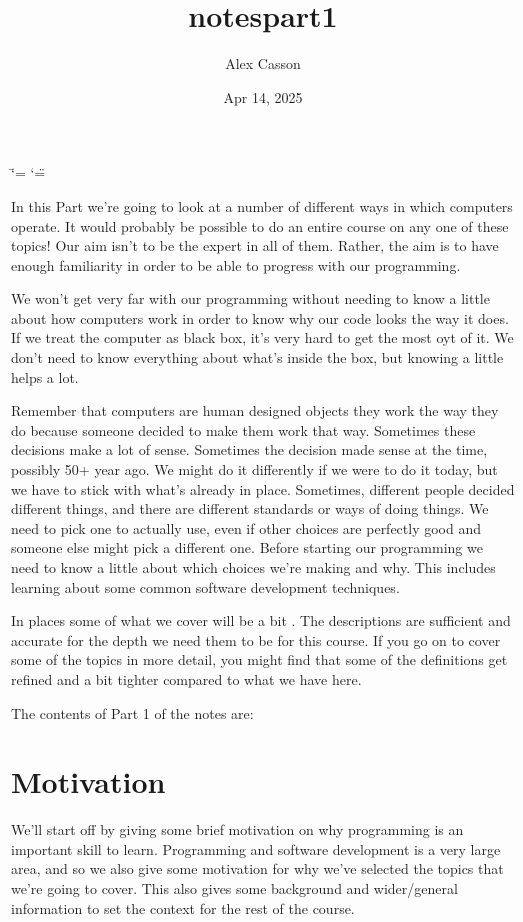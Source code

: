 \documentclass[letterpaper,10pt,british]{sphinxmanual}
\title{notes\sphinxhyphen{}part1}
\date{Apr 14, 2025}
\author{Alex Casson}
\begin{document}
\ifdefined\shorthandoff
  \ifnum\catcode`\=\string=\active\shorthandoff{=}\fi
  \ifnum\catcode`\"=\active{}\fi
\fi

\pagestyle{empty}
\sphinxmaketitle
\pagestyle{plain}
\sphinxtableofcontents
\pagestyle{normal}
\label{\detokenize{index::doc}}


\sphinxAtStartPar
In this Part we’re going to look at a number of different ways in which computers operate. It would probably be possible to do an entire course on any one of these topics! Our aim isn’t to be the expert in all of them. Rather, the aim is to have enough familiarity in order to be able to progress with our programming.

\sphinxAtStartPar
We won’t get very far with our programming without needing to know a little about how computers work  in order to know why our code looks the way it does. If we treat the computer as black box, it’s very hard to get the most oyt of it. We don’t need to know everything about what’s inside the box, but knowing a little helps a lot.

\sphinxAtStartPar
Remember that computers are human designed objects \sphinxhyphen{} they work the way they do because someone decided to make them work that way. Sometimes these decisions make a lot of sense. Sometimes the decision made sense at the time, possibly 50+ year ago. We might do it differently if we were to do it today, but we have to stick with what’s already in place. Sometimes, different people decided different things, and there are different standards or ways of doing things. We need to pick one to actually use, even if other choices are perfectly good and someone else might pick a different one. Before starting our programming we need to know a little about which choices we’re making and why. This includes learning about some common software development techniques.

\sphinxAtStartPar
In places some of what we cover will be a bit . The descriptions are sufficient and accurate for the depth we need them to be for this course. If you go on to cover some of the topics in more detail, you might find that some of the definitions get refined and a bit tighter compared to what we have here.

\sphinxAtStartPar
The contents of Part 1 of the notes are:

\sphinxstepscope


\chapter{Motivation}
\label{\detokenize{chapters/motivation:motivation}}\label{\detokenize{chapters/motivation::doc}}
\sphinxAtStartPar
We’ll start off by giving some brief motivation on why programming is an important skill to learn. Programming and software development is a very large area, and so we also give some motivation for why we’ve selected the topics that we’re going to cover. This also gives some background and wider/general information to set the context for the rest of the course.
\end{document}
